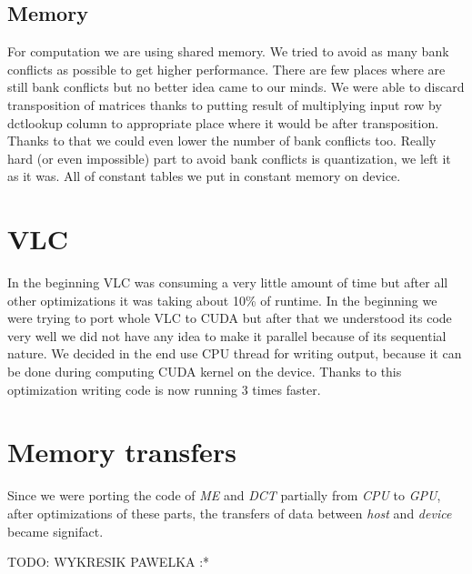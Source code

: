 \documentclass[11pt]{article}
\begin{document}
\subsection{Memory}
For computation we are using shared memory. We tried to avoid as many bank conflicts as possible to get higher performance. There are few places where are still bank conflicts but no better idea came to our minds. We were able to discard transposition of matrices thanks to putting result of multiplying input row by dctlookup column to appropriate place where it would be after transposition. Thanks to that we could even lower the number of bank conflicts too. Really hard (or even impossible) part to avoid bank conflicts is quantization, we left it as it was. All of constant tables we put in constant memory on device.

\section{VLC}
In the beginning VLC was consuming a very little amount of time but after all other optimizations it was taking about 10\% of runtime. In the beginning we were trying to port whole VLC to CUDA but after that we understood its code very well we did not have any idea to make it parallel because of its sequential nature. We decided in the end use CPU thread for writing output, because it can be done during computing CUDA kernel on the device. Thanks to this optimization writing code is now running 3 times faster.
\section{Memory transfers}
Since we were porting the code of \emph{ME} and \emph{DCT} partially from 
\emph{CPU} to \emph{GPU}, after optimizations of these parts, the transfers
of data between \emph{host} and \emph{device} became signifact.

TODO: WYKRESIK PAWELKA :*
\end{document}
